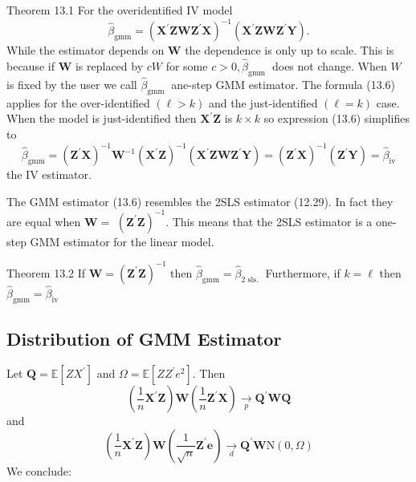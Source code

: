 \documentclass[10pt]{article}
\begin{document}
Theorem 13.1 For the overidentified IV model
$$
\widehat{\beta}_{\mathrm{gmm}}=\left(\boldsymbol{X}^{\prime} \boldsymbol{Z} \boldsymbol{W} \boldsymbol{Z}^{\prime} \boldsymbol{X}\right)^{-1}\left(\boldsymbol{X}^{\prime} \boldsymbol{Z} \boldsymbol{W} \boldsymbol{Z}^{\prime} \boldsymbol{Y}\right) .
$$
While the estimator depends on $\boldsymbol{W}$ the dependence is only up to scale. This is because if $\boldsymbol{W}$ is replaced by $c W$ for some $c>0, \widehat{\beta}_{\text {gmm }}$ does not change. When $W$ is fixed by the user we call $\widehat{\beta}_{\text {gmm }}$ ane-step GMM estimator. The formula (13.6) applies for the over-identified $(\ell>k)$ and the just-identified $(\ell=k)$ case. When the model is just-identified then $\boldsymbol{X}^{\prime} \boldsymbol{Z}$ is $k \times k$ so expression (13.6) simplifies to
$$
\widehat{\beta}_{\mathrm{gmm}}=\left(\boldsymbol{Z}^{\prime} \boldsymbol{X}\right)^{-1} \boldsymbol{W}^{-1}\left(\boldsymbol{X}^{\prime} \boldsymbol{Z}\right)^{-1}\left(\boldsymbol{X}^{\prime} \boldsymbol{Z} \boldsymbol{W} \boldsymbol{Z}^{\prime} \boldsymbol{Y}\right)=\left(\boldsymbol{Z}^{\prime} \boldsymbol{X}\right)^{-1}\left(\boldsymbol{Z}^{\prime} \boldsymbol{Y}\right)=\widehat{\beta}_{\mathrm{iv}}
$$
the IV estimator.

The GMM estimator (13.6) resembles the 2SLS estimator (12.29). In fact they are equal when $\boldsymbol{W}=$ $\left(\boldsymbol{Z}^{\prime} \boldsymbol{Z}\right)^{-1}$. This means that the 2SLS estimator is a one-step GMM estimator for the linear model.

Theorem 13.2 If $\boldsymbol{W}=\left(\boldsymbol{Z}^{\prime} \boldsymbol{Z}\right)^{-1}$ then $\widehat{\beta}_{\mathrm{gmm}}=\widehat{\beta}_{2 \text { sls. }}$ Furthermore, if $k=\ell$ then $\widehat{\beta}_{\mathrm{gmm}}=\widehat{\beta}_{\mathrm{iv}}$

\subsection{Distribution of GMM Estimator}
Let $\boldsymbol{Q}=\mathbb{E}\left[Z X^{\prime}\right]$ and $\Omega=\mathbb{E}\left[Z Z^{\prime} e^{2}\right]$. Then
$$
\left(\frac{1}{n} \boldsymbol{X}^{\prime} \boldsymbol{Z}\right) \boldsymbol{W}\left(\frac{1}{n} \boldsymbol{Z}^{\prime} \boldsymbol{X}\right) \underset{p}{\longrightarrow} \boldsymbol{Q}^{\prime} \boldsymbol{W} \boldsymbol{Q}
$$
and
$$
\left(\frac{1}{n} \boldsymbol{X}^{\prime} \boldsymbol{Z}\right) \boldsymbol{W}\left(\frac{1}{\sqrt{n}} \boldsymbol{Z}^{\prime} \boldsymbol{e}\right) \underset{d}{\longrightarrow} \boldsymbol{Q}^{\prime} \boldsymbol{W} \mathrm{N}(0, \Omega)
$$
We conclude:
\end{document}

